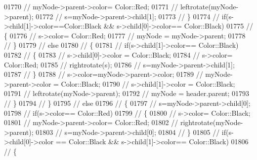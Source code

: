 \begin{DoxyCode}
01770 \textcolor{comment}{//                      myNode->parent->color= Color::Red;}
01771 \textcolor{comment}{//                      leftrotate(myNode->parent);}
01772 \textcolor{comment}{//                      s=myNode->parent->child[1];}
01773 \textcolor{comment}{//                  \}}
01774 \textcolor{comment}{//                  if(s->child[1]->color==Color::Black && s->child[0]->color== Color::Black)}
01775 \textcolor{comment}{//                  \{}
01776 \textcolor{comment}{//                      s->color= Color::Red;}
01777 \textcolor{comment}{//                      myNode = myNode->parent;}
01778 \textcolor{comment}{//                  \}}
01779 \textcolor{comment}{//                  else}
01780 \textcolor{comment}{//                  \{}
01781 \textcolor{comment}{//                      if(s->child[1]->color== Color::Black)}
01782 \textcolor{comment}{//                      \{}
01783 \textcolor{comment}{//                          s->child[0]->color = Color::Black;}
01784 \textcolor{comment}{//                          s->color= Color::Red;}
01785 \textcolor{comment}{//                          rightrotate(s);}
01786 \textcolor{comment}{//                          s=myNode->parent->child[1];}
01787 \textcolor{comment}{//                      \}}
01788 \textcolor{comment}{//                      s->color=myNode->parent->color;}
01789 \textcolor{comment}{//                      myNode->parent->color = Color::Black;}
01790 \textcolor{comment}{//                      s->child[1]->color = Color::Black;}
01791 \textcolor{comment}{//                      leftrotate(myNode->parent);}
01792 \textcolor{comment}{//                      myNode = header.parent;}
01793 \textcolor{comment}{//                  \}}
01794 \textcolor{comment}{//              \}}
01795 \textcolor{comment}{//              else}
01796 \textcolor{comment}{//              \{}
01797 \textcolor{comment}{//                  s=myNode->parent->child[0];}
01798 \textcolor{comment}{//                  if(s->color== Color::Red)}
01799 \textcolor{comment}{//                  \{}
01800 \textcolor{comment}{//                      s->color= Color::Black;}
01801 \textcolor{comment}{//                      myNode->parent->color= Color::Red;}
01802 \textcolor{comment}{//                      rightrotate(myNode->parent);}
01803 \textcolor{comment}{//                      s=myNode->parent->child[0];}
01804 \textcolor{comment}{//                  \}}
01805 \textcolor{comment}{//                  if(s->child[0]->color == Color::Black && s->child[1]->color== Color::Black)}
01806 \textcolor{comment}{//                  \{}

\end{DoxyCode}
